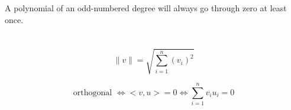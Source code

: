 \documentclass{report}
\newcommand{\rm}{\textrm}
\begin{document}
A polynomial of an odd-numbered degree will always go through zero at least once.

\section{}

\subsection{}

\subsection{}

\chapter{}

\chapter{}

\chapter{}

\chapter{}

\chapter{}

\chapter{}

\chapter{}

\section{}

\label{norm}$$\|v\|=\sqrt{\sum_{i=1}^n(v_i)^2}$$

$$\rm{orthogonal }\Leftrightarrow <v,u> = 0 \Leftrightarrow \sum_{i=1}^nv_iu_i=0$$
\end{document}
